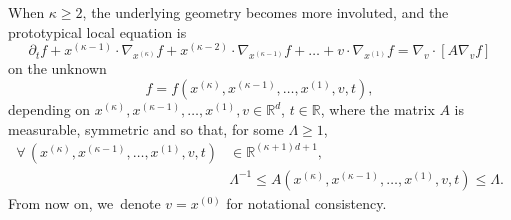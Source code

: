 \documentclass[JEP,XML,SOM,Unicode,NoFloatCountersInSection,published]{cedram}
\theoremstyle{definition}
\newcommand\R{{\mathbb R}}
\begin{document}
When $\kappa \ge 2$, the underlying geometry becomes more involuted, and
the prototypical local equation is
\begin{equation}
\label{eq:kolmo-k}
\partial_t f + x^{(\kappa-1)} \cdot \nabla_{x^{(\kappa)}} f
+ x^{(\kappa-2)} \cdot \nabla_{x^{(\kappa-1)}} f +
\dots + v \cdot \nabla_{x^{(1)}} f =
\nabla_v \cdot \left[ A \nabla_v f \right]
\end{equation}
on the unknown
\[
f=f(x^{(\kappa)},x^{(\kappa-1)}, \dots, x^{(1)},v,t),
\]
depending
on $x^{(\kappa)},x^{(\kappa-1)}, \dots, x^{(1)},v \in \R^d$,
$t \in \R$, where the matrix $A$ is measurable, symmetric and so
that, for some $\Lambda \ge 1$,
\begin{equation} \label{eq:ellip-k}
\begin{aligned}
\forall \, (x^{(\kappa)},x^{(\kappa-1)}, \dots, x^{(1)},v,t)
& \in \R^{(\kappa+1)d+1}, \\
&\Lambda^{-1} \le
A(x^{(\kappa)},x^{(\kappa-1)},\dots,x^{(1)},v,t) \le \Lambda.
\end{aligned}
\end{equation}
From now on, we~denote $v = x^{(0)}$ for notational consistency.
\end{document}
